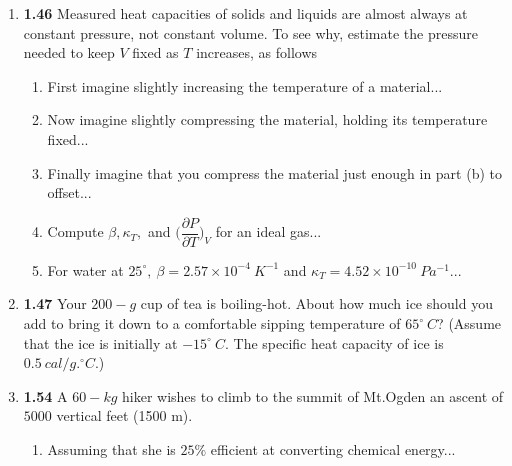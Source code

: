 \documentclass[fleqn]{article}
\begin{document}
  \begin{enumerate}
    \item \textbf{1.46} Measured heat capacities of solids and liquids are almost always at constant  pressure,
    not constant volume. To see why, estimate the pressure needed to keep $V$ fixed as $T$ increases, as follows

    \begin{enumerate}
      \item First imagine slightly increasing the temperature of a material...



      \item Now imagine slightly compressing the material, holding its temperature fixed...


      \item Finally imagine that you compress the material just enough in part (b) to offset...



      \item Compute $\beta, \kappa_T,$ and $\bigg( \dfrac{\partial P}{\partial T} \bigg)_V$ for an ideal gas...


      \item For water at $25^{\circ}, ~ \beta=2.57 \times 10^{-4} ~ K^{-1}$ and $\kappa_T=4.52 \times 10^{-10} ~ Pa^{-1}$...


    \end{enumerate}
    
    
    \item \textbf{1.47} Your $200-g$ cup of tea is boiling-hot. About how much ice should you add to bring 
    it down to a comfortable sipping temperature of $65^{\circ} ~ C$? (Assume that the ice is initially 
    at $-15^{\circ} ~ C$. The specific heat capacity of ice is $0.5 ~ cal/g.^{\circ}C.$) 


    \item \textbf{1.54} A $60-kg$ hiker wishes to climb to the summit of Mt.Ogden an ascent of $5000$ vertical
    feet (1500 m).
    \begin{enumerate}
      \item Assuming that she is $25\%$ efficient at converting chemical energy...


\end{enumerate}
\end{enumerate}
\end{document}
